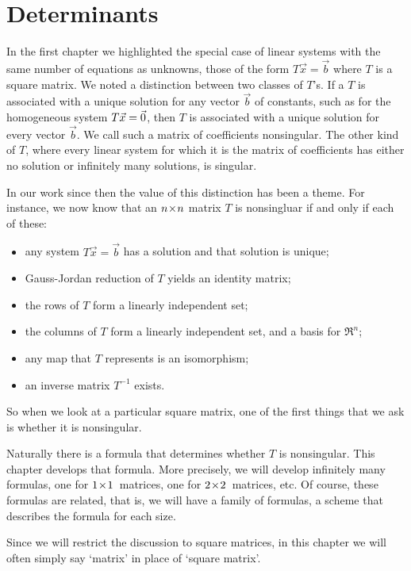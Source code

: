 \chapter{Determinants} 
In the first chapter  
we highlighted the special case of linear systems
with the same number of equations as unknowns, 
those of the form \( T\vec{x}=\vec{b} \) where $T$ is a square matrix.
We noted a distinction between two classes of $T$'s.
If a $T$ is associated with a unique solution
for any vector $\vec{b}$ of constants, 
such as for the homogeneous system $T\vec{x}=\vec{0}$, then
$T$ is associated with a unique solution for every vector $\vec{b}$.
We call such a matrix of coefficients nonsingular.
The other kind of $T$, where every linear system for which it is the 
matrix of coefficients has either no solution or infinitely many solutions,
is singular.  

In our work since then the value of this distinction has been a theme.
For instance, we now know that an 
\( n \! \times \! n \) matrix \( T \) is nonsingluar if and only if
each of these:
\begin{itemize}
   \item any system \( T\vec{x}=\vec{b} \) has a solution 
          and that solution is unique;
   \item Gauss-Jordan reduction of $T$ yields an identity matrix;
   \item the rows of $T$ form a linearly independent set;
   \item the columns of \( T \) form a linearly independent set, 
         and a basis for \( \Re^n \);
   \item any map that \( T \) represents is an isomorphism;
   \item an inverse matrix \( T^{-1} \) exists.
\end{itemize}
So when we look at a particular square matrix, one of the first things
that we ask is whether it is  
nonsingular.

Naturally there is a formula that determines whether $T$ is nonsingular.
This chapter develops that formula. 
More precisely, we will develop infinitely many formulas, 
one for $1 \! \times \! 1$~matrices, one for $2 \! \times \! 2$~matrices, etc.
Of course, these formulas are related,  that is, 
we will have a family of
formulas, a scheme that describes the formula for each size.

Since we will restrict the discussion to square matrices, in this chapter
we will often simply say `matrix' in place of `square matrix'.





